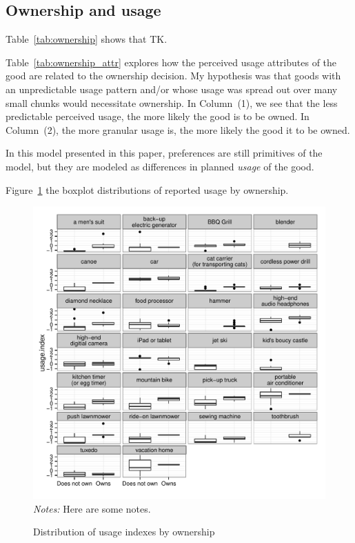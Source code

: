 \documentclass[11pt]{article}
\begin{document}
\subsection{Ownership and usage} 

Table~\ref{tab:ownership} shows that TK. 



Table~\ref{tab:ownership_attr} explores how the perceived usage attributes of the good are related to the ownership decision.
My hypothesis was that goods with an unpredictable usage pattern and/or whose usage was spread out over many small chunks would necessitate ownership. 
In Column~(1), we see that the less predictable perceived usage, the more likely the good is to be owned. 
In Column~(2), the more granular usage is, the more likely the good it to be owned. 

 

In this model presented in this paper, preferences are still primitives of the model, but they are modeled as differences in planned \emph{usage} of the good.  

Figure~\ref{fig:usage_by_own} the boxplot distributions of reported usage by ownership. 

\begin{figure}
\centering 
\caption{Distribution of usage indexes by ownership}
\label{fig:usage_by_own}
\begin{minipage}{0.90 \linewidth}
\includegraphics[width = \linewidth]{./plots/usage_by_own.pdf} 
\\
{\footnotesize
\emph{Notes:} Here are some notes. 
}
\end{minipage} 
\end{figure} 
\end{document}
